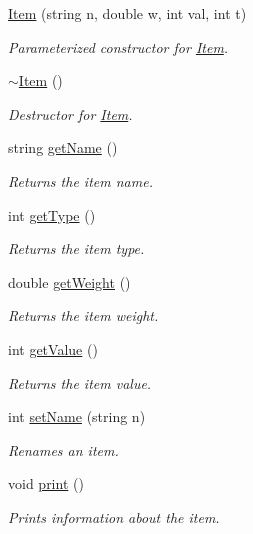 \begin{DoxyCompactItemize}
\item 
\mbox{\hyperlink{class_item_a4f5c1609ec43a92f45af72034341244e}{Item}} (string n, double w, int val, int t)
\begin{DoxyCompactList}\small\item\em Parameterized constructor for \mbox{\hyperlink{class_item}{Item}}. \end{DoxyCompactList}\item 
\mbox{\label{class_item_a11663c84075b78c3ae5e30fdfcd7c458}} 
\mbox{\hyperlink{class_item_a11663c84075b78c3ae5e30fdfcd7c458}{$\sim$\+Item}} ()
\begin{DoxyCompactList}\small\item\em Destructor for \mbox{\hyperlink{class_item}{Item}}. \end{DoxyCompactList}\item 
string \mbox{\hyperlink{class_item_a63d7f2148b699e539aae354b01559811}{get\+Name}} ()
\begin{DoxyCompactList}\small\item\em Returns the item name. \end{DoxyCompactList}\item 
int \mbox{\hyperlink{class_item_ae6ecba9b0f87146e4062bb4ad4f712b5}{get\+Type}} ()
\begin{DoxyCompactList}\small\item\em Returns the item type. \end{DoxyCompactList}\item 
double \mbox{\hyperlink{class_item_ada983fd5602c02f2ec2bc86401b2355e}{get\+Weight}} ()
\begin{DoxyCompactList}\small\item\em Returns the item weight. \end{DoxyCompactList}\item 
int \mbox{\hyperlink{class_item_a9ceb9a0df0efe18d23e347471f908be7}{get\+Value}} ()
\begin{DoxyCompactList}\small\item\em Returns the item value. \end{DoxyCompactList}\item 
int \mbox{\hyperlink{class_item_ae953e703d38c89ab573201c3869b1c2b}{set\+Name}} (string n)
\begin{DoxyCompactList}\small\item\em Renames an item. \end{DoxyCompactList}\item 
\mbox{\label{class_item_ae8a8da6445f20c9f658a69ce5b003102}} 
void \mbox{\hyperlink{class_item_ae8a8da6445f20c9f658a69ce5b003102}{print}} ()
\begin{DoxyCompactList}\small\item\em Prints information about the item. \end{DoxyCompactList}\end{DoxyCompactItemize}
